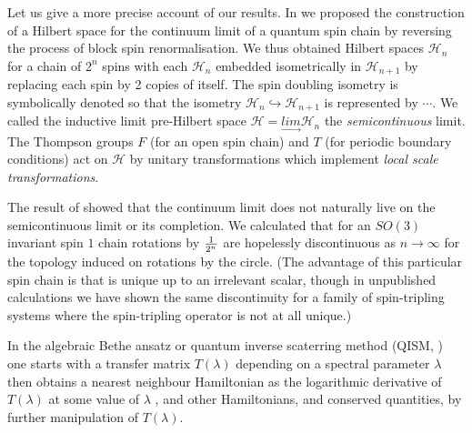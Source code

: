 \documentclass[11pt]{amsart}
\newcommand{\1}{\mathcal I}
\newcommand{\5}{\vskip 5pt}
\begin{document}
Let us give a more precise account of our results. In \cite{jonogo} we proposed the construction of a Hilbert space for the continuum limit of a quantum spin
chain by reversing the process of block spin renormalisation.  We thus obtained Hilbert spaces $\mathcal H_n$ for
a chain of $2^n$ spins with each $\mathcal H_n$ embedded isometrically in $\mathcal H_{n+1}$ by replacing
each spin by 2 copies of itself. The spin doubling isometry is symbolically denoted \Y so that the isometry 
$\mathcal H_{n}\hookrightarrow \mathcal H_{n+1}$ is represented by \Y\Y\Y$\cdots$\Y. We called the inductive limit pre-Hilbert space
$\mathcal H=\underset{\rightarrow} {lim} \mathcal H_n$ the \emph{semicontinuous} limit. The Thompson groups
$F$ (for an open spin chain)  and $T$ (for periodic boundary conditions) act on $\mathcal H$ by unitary transformations
which implement \emph{local scale transformations}.
  
  The result of \cite{jonogo} showed that the continuum limit does not naturally live on the semicontinuous limit or its completion.
  We calculated that for an $SO(3)$ invariant spin $1$ chain rotations by $1\over 2^n$ are hopelessly discontinuous as 
  $n\rightarrow \infty$ for the topology induced on rotations by the circle. (The advantage of this particular spin chain is
  that \Y is unique up to an irrelevant scalar, though in unpublished calculations we have shown the same discontinuity for
  a family of spin-tripling systems where the spin-tripling operator is not at all unique.) 
   
   
  In the algebraic Bethe ansatz or quantum inverse scaterring method (QISM, \cite{IK,Fad}) one starts with a transfer matrix $T(\lambda)$ depending
 on a spectral parameter $\lambda$ then obtains a nearest neighbour Hamiltonian as the logarithmic derivative of 
 $T(\lambda)$ at some value of $\lambda$ , and other Hamiltonians, and conserved quantities, by further manipulation
 of   $T(\lambda)$.
  
\end{document}
